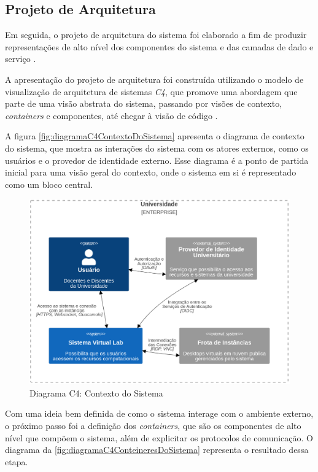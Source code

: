 \subsection{Projeto de Arquitetura}
\label{subsec:projetoDeArquitetura}

Em seguida, o projeto de arquitetura do sistema foi elaborado a fim de produzir representações de alto nível dos componentes do sistema e das camadas de dado e serviço \citep{pressman2016}.

A apresentação do projeto de arquitetura foi construída utilizando o modelo de visualização de arquitetura de sistemas \textit{C4}, que promove uma abordagem que parte de uma visão abstrata do sistema, passando por visões de contexto, \textit{containers} e componentes, até chegar à visão de código \citep{brown2018}.

A figura \autoref{fig:diagramaC4ContextoDoSistema} apresenta o diagrama de contexto do sistema, que mostra as interações do sistema com os atores externos, como os usuários e o provedor de identidade externo. Esse diagrama é a ponto de partida inicial para uma visão geral do contexto, onde o sistema em si é representado como um bloco central.

\begin{figure}[H]
\caption{Diagrama C4: Contexto do Sistema}
\label{fig:diagramaC4ContextoDoSistema}
\includegraphics[width=\textwidth]{capitulos/2-metodologia/files/c4-system-context.png}
\end{figure}

Com uma ideia bem definida de como o sistema interage com o ambiente externo, o próximo passo foi a definição dos \textit{containers}, que são os componentes de alto nível que compõem o sistema, além de explicitar os protocolos de comunicação. O diagrama da \autoref{fig:diagramaC4ConteineresDoSistema} representa o resultado dessa etapa.

